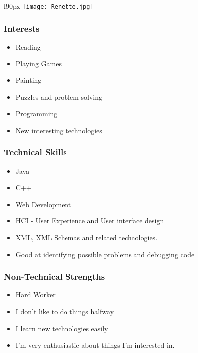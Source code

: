 \begin{wrapfigure}[8]{l}{90px}
\texttt{[image: Renette.jpg]}
\end{wrapfigure}
\textcolor{white}{}
\subsubsection{Interests}
\begin{itemize}
	\item Reading
	\item Playing Games
	\item Painting
	\item Puzzles and problem solving
	\item Programming
	\item New interesting technologies
\end{itemize}
\subsubsection{Technical Skills}
\begin{itemize}
	\item Java
	\item C++
	\item Web Development
	\item HCI - User Experience and User interface design
	\item XML, XML Schemas and related technologies.
	\item Good at identifying possible problems and debugging code
\end{itemize}

\subsubsection{Non-Technical Strengths}
\begin{itemize}
	\item Hard Worker
	\item I don't like to do things halfway
	\item I learn new technologies easily
	\item I'm very enthusiastic about things I'm interested in.
\end{itemize}